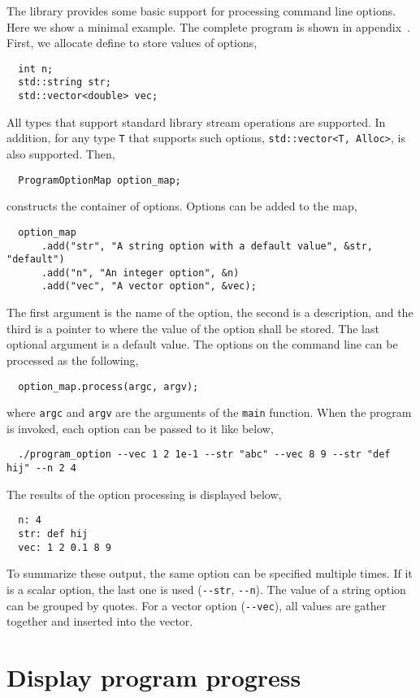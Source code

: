 The library provides some basic support for processing command line options.
Here we show a minimal example. The complete program is shown in
appendix~. First, we
allocate define to store values of options,
\begin{Verbatim}
  int n;
  std::string str;
  std::vector<double> vec;
\end{Verbatim}
All types that support standard library \io stream operations are supported. In
addition, for any type \verb|T| that supports such options,
\verb|std::vector<T, Alloc>|, is also supported. Then,
\begin{Verbatim}
  ProgramOptionMap option_map;
\end{Verbatim}
constructs the container of options. Options can be added to the map,
\begin{Verbatim}
  option_map
      .add("str", "A string option with a default value", &str, "default")
      .add("n", "An integer option", &n)
      .add("vec", "A vector option", &vec);
\end{Verbatim}
The first argument is the name of the option, the second is a description, and
the third is a pointer to where the value of the option shall be stored. The
last optional argument is a default value. The options on the command line can
be processed as the following,
\begin{Verbatim}
  option_map.process(argc, argv);
\end{Verbatim}
where \verb|argc| and \verb|argv| are the arguments of the \verb|main|
function. When the program is invoked, each option can be passed to it like
below,
\begin{Verbatim}
  ./program_option --vec 1 2 1e-1 --str "abc" --vec 8 9 --str "def hij" --n 2 4
\end{Verbatim}
The results of the option processing is displayed below,
\begin{Verbatim}
  n: 4
  str: def hij
  vec: 1 2 0.1 8 9
\end{Verbatim}
To summarize these output, the same option can be specified multiple times. If
it is a scalar option, the last one is used (\verb|--str|, \verb|--n|). The
value of a string option can be grouped by quotes. For a vector option
(\verb|--vec|), all values are gather together and inserted into the vector.

\section{Display program progress}
\label{sec:Display program progress}

